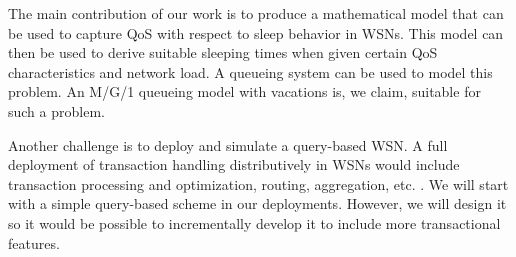 The main contribution of our work is to produce a mathematical model that can be used to capture QoS with respect to sleep behavior in WSNs. This model can then be used to derive suitable sleeping times when given certain QoS characteristics and network load. A queueing system \cite{21} can be used to model this problem. An M/G/1 queueing model with vacations \cite{20} is, we claim, suitable for such a problem.

Another challenge is to deploy and simulate a query-based WSN. A full deployment of transaction handling distributively in WSNs would include transaction processing and optimization, routing, aggregation, etc. \cite{2}. We will start with a simple query-based scheme in our deployments. However, we will design it so it would be possible to incrementally develop it to include more transactional features. 
